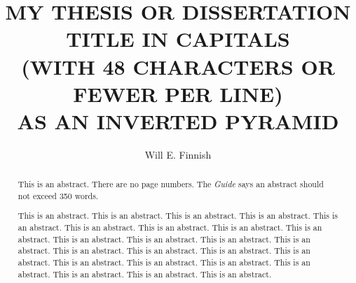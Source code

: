 \documentclass[12pt]{article}
\begin{document}

%
%
\title{MY THESIS OR DISSERTATION TITLE IN CAPITALS \\
(WITH 48 CHARACTERS OR FEWER PER LINE)\\
AS AN INVERTED PYRAMID}

\author{Will E. Finnish}



\maketitle



\begin{frontmatter}


\begin{abstract}
This is an abstract.  There are no page numbers.
The \emph{Guide} says an abstract should not exceed 350 words.

This is an abstract. This is an abstract. This is an abstract. This is an abstract. This is an abstract. This is an abstract. This is an abstract. This is an abstract. This is an abstract. This is an abstract. This is an abstract. This is an abstract. This is an abstract. This is an abstract. This is an abstract. This is an abstract. This is an abstract. This is an abstract. This is an abstract. This is an abstract. This is an abstract. This is an abstract. This is an abstract. This is an abstract. 
\end{abstract}

\newpage



\tableofcontents

\newpage

\listoftables

\newpage

\listoffigures

\newpage


\end{frontmatter}
\end{document}
